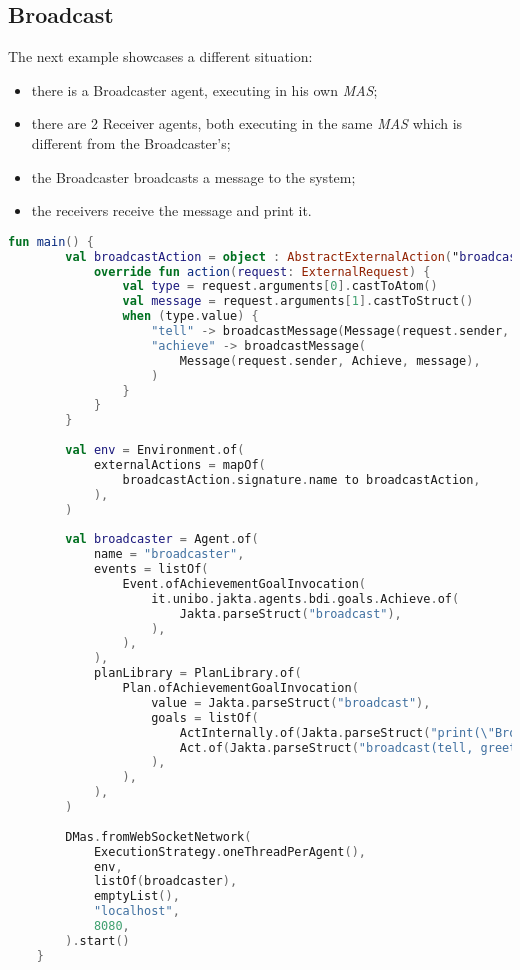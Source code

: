 \subsection{Broadcast}
The next example showcases a different situation:
\begin{itemize}
    \item there is a Broadcaster agent, executing in his own \textit{MAS};
    \item there are 2 Receiver agents, both executing in the same \textit{MAS} which is different from the Broadcaster's;
    \item the Broadcaster broadcasts a message to the system;
    \item the receivers receive the message and print it.
\end{itemize}

\begin{lstlisting}[caption={Usage example: \texttt{Broadcast}: Broadcaster's code.}, label={lst:Broadcast}, language=Kotlin]
    fun main() {
        val broadcastAction = object : AbstractExternalAction("broadcast", 2) {
            override fun action(request: ExternalRequest) {
                val type = request.arguments[0].castToAtom()
                val message = request.arguments[1].castToStruct()
                when (type.value) {
                    "tell" -> broadcastMessage(Message(request.sender, Tell, message))
                    "achieve" -> broadcastMessage(
                        Message(request.sender, Achieve, message),
                    )
                }
            }
        }
    
        val env = Environment.of(
            externalActions = mapOf(
                broadcastAction.signature.name to broadcastAction,
            ),
        )
    
        val broadcaster = Agent.of(
            name = "broadcaster",
            events = listOf(
                Event.ofAchievementGoalInvocation(
                    it.unibo.jakta.agents.bdi.goals.Achieve.of(
                        Jakta.parseStruct("broadcast"),
                    ),
                ),
            ),
            planLibrary = PlanLibrary.of(
                Plan.ofAchievementGoalInvocation(
                    value = Jakta.parseStruct("broadcast"),
                    goals = listOf(
                        ActInternally.of(Jakta.parseStruct("print(\"Broadcast message\")")),
                        Act.of(Jakta.parseStruct("broadcast(tell, greetings)")),
                    ),
                ),
            ),
        )
    
        DMas.fromWebSocketNetwork(
            ExecutionStrategy.oneThreadPerAgent(),
            env,
            listOf(broadcaster),
            emptyList(),
            "localhost",
            8080,
        ).start()
    }
\end{lstlisting}

